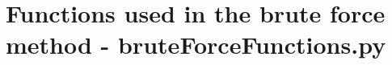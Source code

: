 
\chapter{Functions used in the brute force method - bruteForceFunctions.py} %

\label{AppendixC} %









